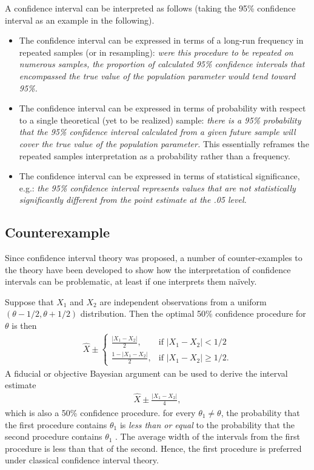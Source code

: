 \documentclass[11pt,a4paper]{article}
\begin{document}
A confidence interval can be interpreted as follows (taking the 95\% confidence interval as an example in the following).
\begin{itemize}
\item The confidence interval can be expressed in terms of a long-run 
frequency in repeated samples (or in resampling): \emph{were this procedure to be repeated on numerous samples, 
the proportion of calculated 95\% confidence intervals that encompassed the true value of the population parameter would tend toward 95\%.}
\item The confidence interval can be expressed in terms of probability with respect to a single theoretical (yet to be realized) sample: \emph{there is a 95\% probability that the 95\% confidence interval calculated from a given future sample 
will cover the true value of the population parameter.}
This essentially reframes the repeated samples interpretation as a probability rather than a frequency.
\item The confidence interval can be expressed in terms of statistical significance, e.g.: \emph{the 95\% confidence 
interval represents values that are not statistically significantly different from the point estimate at the .05 level.}
\end{itemize}

\subsection{Counterexample}

Since confidence interval theory was proposed, 
a number of counter-examples to the theory have been developed to show how 
the interpretation of confidence intervals can be problematic, 
at least if one interprets them naïvely.

Suppose that \(X_{1}\) and \(X_{2}\) are independent observations from a uniform \((\theta - 1/2, \theta + 1/2)\) distribution. 
Then the optimal 50\% confidence procedure for \(\theta\) is then
\begin{align}
  \widehat{X}\pm
  \begin{cases}
    \frac{|X_1 - X_2|}{2}, & \text{if $|X_1 - X_2|< 1/2$}\\
    \frac{1 - |X_1 - X_2|}{2}, & \text{if $|X_1 - X_2| \geq 1/2$}.
  \end{cases}
\end{align}
A fiducial or objective Bayesian argument can be used to derive the interval estimate
\begin{align}
  \widehat{X}\pm \frac{|X_1 - X_2|}{4},
\end{align}
which is also a 50\% confidence procedure. 
for every \(\theta_1 \neq \theta\),
the probability that the first procedure contains \(\theta_1\) 
is \emph{less than or equal} to the probability that the second procedure contains \(\theta_1\) .
The average width of the intervals from the first procedure is less than that of the second. 
Hence, the first procedure is preferred under classical confidence interval theory.
\end{document}
